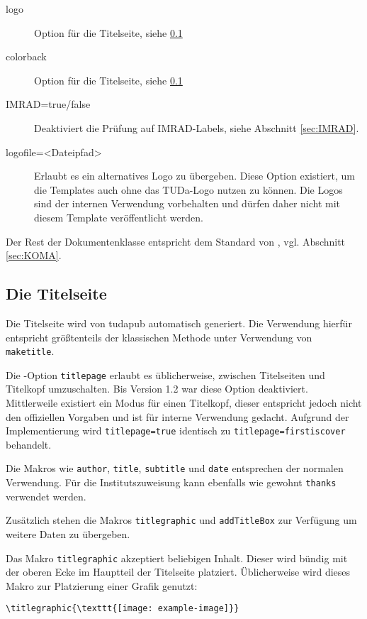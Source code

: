 \documentclass[
	german,
	accentcolor=9c,%
	]{tudapub}
\let\code\texttt
\begin{document}
\begin{description}
	\item[logo] Option für die Titelseite, siehe \ref{sec:title}
	\item[colorback] Option für die Titelseite, siehe \ref{sec:title}
	\item[IMRAD=true/false] Deaktiviert die Prüfung auf IMRAD-Labels, siehe Abschnitt \ref{sec:IMRAD}.
	\item[logofile=<Dateipfad>] Erlaubt es ein alternatives Logo zu übergeben. Diese Option existiert, um die Templates auch ohne das TUDa-Logo nutzen zu können. Die Logos sind der internen Verwendung vorbehalten und dürfen daher nicht mit diesem Template veröffentlicht werden.
\end{description}

\noindent Der Rest der Dokumentenklasse entspricht dem Standard von \KOMAScript, vgl. Abschnitt \ref{sec:KOMA}.

\subsection{Die Titelseite}
\label{sec:title}

Die Titelseite wird von tudapub automatisch generiert. Die Verwendung hierfür entspricht größtenteils der klassischen Methode unter Verwendung von \code{maketitle}.

Die \KOMAScript-Option \code{titlepage} erlaubt es üblicherweise, zwischen Titelseiten und Titelkopf umzuschalten. Bis Version 1.2 war diese Option deaktiviert. Mittlerweile existiert ein Modus für einen Titelkopf, dieser entspricht jedoch nicht den offiziellen Vorgaben und ist für interne Verwendung gedacht. Aufgrund der Implementierung wird \code{titlepage=true} identisch zu \code{titlepage=firstiscover} behandelt.

Die Makros wie \code{author}, \code{title}, \code{subtitle} und \code{date} entsprechen der normalen Verwendung. Für die Institutszuweisung kann ebenfalls wie gewohnt \code{thanks} verwendet werden.

Zusätzlich stehen die Makros \code{titlegraphic} und \code{addTitleBox} zur Verfügung um weitere Daten zu übergeben.

Das Makro \code{titlegraphic} akzeptiert beliebigen Inhalt. Dieser wird bündig mit der oberen Ecke im Hauptteil der Titelseite platziert.
Üblicherweise wird dieses Makro zur Platzierung einer Grafik genutzt:

\begin{verbatim}
\titlegraphic{\texttt{[image: example-image]}}
\end{verbatim}
\end{document}
